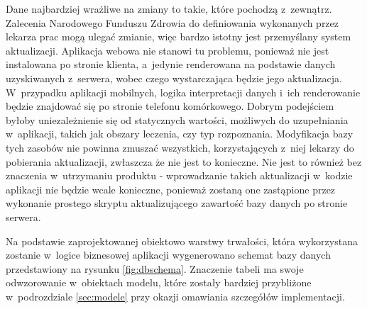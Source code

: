\documentclass[11pt]{aghdpl}
\begin{document}
Dane najbardziej wrażliwe na zmiany to takie, które pochodzą z~zewnątrz. Zalecenia Narodowego Funduszu Zdrowia do definiowania wykonanych przez lekarza prac mogą ulegać zmianie, więc bardzo istotny jest przemyślany system aktualizacji. Aplikacja webowa nie stanowi tu problemu, ponieważ nie jest instalowana po stronie klienta, a~jedynie renderowana na podstawie danych uzyskiwanych z~serwera, wobec czego wystarczająca będzie jego aktualizacja. W~przypadku aplikacji mobilnych, logika interpretacji danych i~ich renderowanie będzie znajdować się po stronie telefonu komórkowego. Dobrym podejściem byłoby uniezależnienie się od statycznych wartości, możliwych do uzupełniania w~aplikacji, takich jak obszary leczenia, czy typ rozpoznania. Modyfikacja bazy tych zasobów nie powinna zmuszać wszystkich, korzystających z~niej lekarzy do pobierania aktualizacji, zwłaszcza że nie jest to konieczne. Nie jest to również bez znaczenia w~utrzymaniu produktu - wprowadzanie takich aktualizacji w~kodzie aplikacji nie będzie wcale konieczne, ponieważ zostaną one zastąpione przez wykonanie prostego skryptu aktualizującego zawartość bazy danych po stronie serwera.

Na podstawie zaprojektowanej obiektowo warstwy trwałości, która wykorzystana zostanie w~logice biznesowej aplikacji wygenerowano schemat bazy danych przedstawiony na rysunku \ref{fig:dbschema}. Znaczenie tabeli ma swoje odwzorowanie w~obiektach modelu, które zostały bardziej przybliżone w~podrozdziale \ref{sec:modele} przy okazji omawiania szczegółów implementacji.
\end{document}
